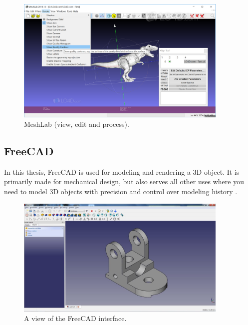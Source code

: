  \begin{figure}[!h]
\begin{center}
\includegraphics[width=4in]{figures02/meshlab.png}
\caption{MeshLab (view, edit and process).}
\end{center}
\end{figure}


\subsection{FreeCAD} \label{freecadb}

In this thesis, FreeCAD is used for modeling and rendering a 3D object. It is primarily made for mechanical design, but also serves all other uses where you need to model 3D objects with precision and control over modeling history \cite{freecad}.

 \begin{figure}[!h]
\begin{center}
\includegraphics[width=4in]{figures02/freecad.jpg}
\caption{A view of the FreeCAD interface.}
\end{center}
\end{figure}
